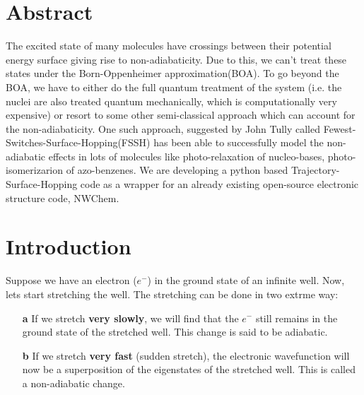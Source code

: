 \documentclass[12pt]{article}
\begin{document}
\section{Abstract}
The excited state of many molecules have crossings between their potential energy surface giving rise to non-adiabaticity. Due to this, we can't treat these states under the Born-Oppenheimer approximation(BOA). To go beyond the BOA, we have to either do the full quantum treatment of the system (i.e. the nuclei are also treated quantum mechanically, which is computationally very expensive) or resort to some other semi-classical approach which can account for the non-adiabaticity. One such approach, suggested by John Tully\cite{tully} called Fewest-Switches-Surface-Hopping(FSSH) has been able to successfully model the non-adiabatic effects in lots of molecules like photo-relaxation of nucleo-bases, photo-isomerizarion of azo-benzenes. We are developing a python based Trajectory-Surface-Hopping code as a wrapper for an already existing open-source electronic structure code, NWChem.  

\section{Introduction}
Suppose we have an electron ($e^-$) in the ground state of an infinite well. Now, lets start stretching the well. The stretching can be done in two extrme way:
\begin{enumerate}
\item[\textbf{a}]{If we stretch \textbf{very slowly}, we will find that the $e^-$ still remains in the ground state of the stretched well. This change is said to be  adiabatic.}
\item[\textbf{b}]{If we stretch \textbf{very fast} (sudden stretch), the electronic wavefunction will now be a superposition of the eigenstates of the stretched well. This is called a non-adiabatic change.}
\end{enumerate}
\end{document}
